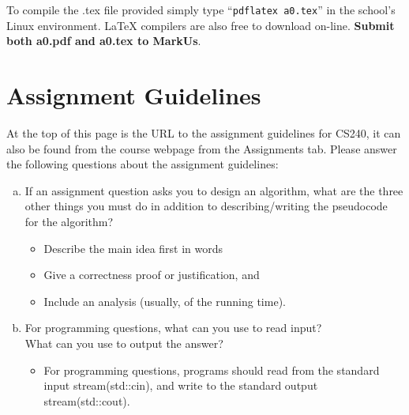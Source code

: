 \documentclass[12pt]{article}
\begin{document}
	To compile the .tex file provided simply type ``\texttt{pdflatex a0.tex}'' 
	in the school's Linux environment. \LaTeX{} compilers are also free to download on-line.
	\textbf{Submit both a0.pdf and a0.tex to MarkUs}.
	
	
	\clearpage
	
	\section{Assignment Guidelines}
	\label{sec:assignment-guidelines}
	
	At the top of this page is the URL to the assignment guidelines for CS240, it can also be found from the course webpage from the Assignments tab. Please answer the following questions about the assignment guidelines:
	
	\begin{enumerate}[a)] 
		\item If an assignment question asks you to design an algorithm, what are the three other things you must do in addition to describing/writing the pseudocode for the algorithm?
		
		\begin{itemize}
			\item Describe the main idea first in words
			\item Give a correctness proof or justification, and
			\item Include an analysis (usually, of the running time).
		\end{itemize}	
		
		\item For programming questions, what can you use to read input? \\ What can you use to output the answer?
		
		\begin{itemize}
			\item For programming questions, programs should read from the standard input stream(std::cin), and write to the standard output stream(std::cout).
		\end{itemize}
		
	\end{enumerate}
	
\end{document}

